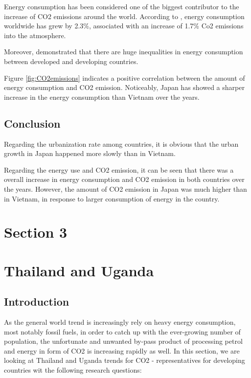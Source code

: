 \documentclass[11pt,a4paper,]{article}
\begin{document}
Energy consumption has been considered one of the biggest contributor to the increase of CO2 emissions around the world. According to \textcite{WANG20182144}, energy consumption worldwide has grew by 2.3\%, associated with an increase of 1.7\% Co2 emissions into the atmosphere.

Moreover, \textcite{owidenergy} demonstrated that there are huge inequalities in energy consumption between developed and developing countries.

Figure \ref{fig:CO2emissions} indicates a positive correlation between the amount of energy consumption and CO2 emission. Noticeably, Japan has showed a sharper increase in the energy consumption than Vietnam over the years.

\hypertarget{conclusion-1}{%
\subsection{Conclusion}\label{conclusion-1}}

Regarding the urbanization rate among countries, it is obvious that the urban growth in Japan happened more slowly than in Vietnam.

Regarding the energy use and CO2 emission, it can be seen that there was a overall increase in energy consumption and CO2 emission in both countries over the years. However, the amount of CO2 emission in Japan was much higher than in Vietnam, in response to larger consumption of energy in the country.

\hypertarget{section-3}{%
\section{Section 3}\label{section-3}}

\section*{Thailand and Uganda}

\hypertarget{introduction-2}{%
\subsection{Introduction}\label{introduction-2}}

As the general world trend is increasingly rely on heavy energy consumption, most notably fossil fuels, in order to catch up with the ever-growing number of population, the unfortunate and unwanted by-pass product of processing petrol and energy in form of CO2 is increasing rapidly as well. In this section, we are looking at Thailand and Uganda trends for CO2 - representatives for developing countries wit the following research questions:
\end{document}
